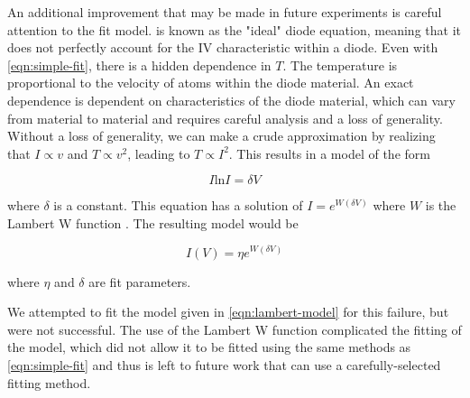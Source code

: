 \documentclass[reprint]{revtex4-1}
\begin{document}
An additional improvement that may be made in future experiments is careful attention to the fit model.  is known as the "ideal" diode equation, meaning that it does not perfectly account for the IV characteristic within a diode. Even with \cref{eqn:simple-fit}, there is a hidden dependence in $T$. The temperature is proportional to the velocity of atoms within the diode material. An exact dependence is dependent on characteristics of the diode material, which can vary from material to material and requires careful analysis and a loss of generality. Without a loss of generality, we can make a crude approximation by realizing that $I \propto v$ and $T \propto v^2$, leading to $T \propto I^2$. This results in a model of the form

\begin{equation}
I \mathrm{ln} I = \delta V 
\end{equation}

where $\delta$ is a constant. This equation has a solution of $I = e^{W\left(\delta V \right)}$ where $W$ is the Lambert W function \cite{lambertW}. The resulting model would be

\begin{equation}
I(V) = \eta e^{W \left(\delta V\right)}
\label{eqn:lambert-model}
\end{equation}

where $\eta$ and $\delta$ are fit parameters.

We attempted to fit the model given in \cref{eqn:lambert-model} for this failure, but were not successful. The use of the Lambert W function complicated the fitting of the model, which did not allow it to be fitted using the same methods as \cref{eqn:simple-fit} and thus is left to future work that can use a carefully-selected fitting method.



\end{document}
